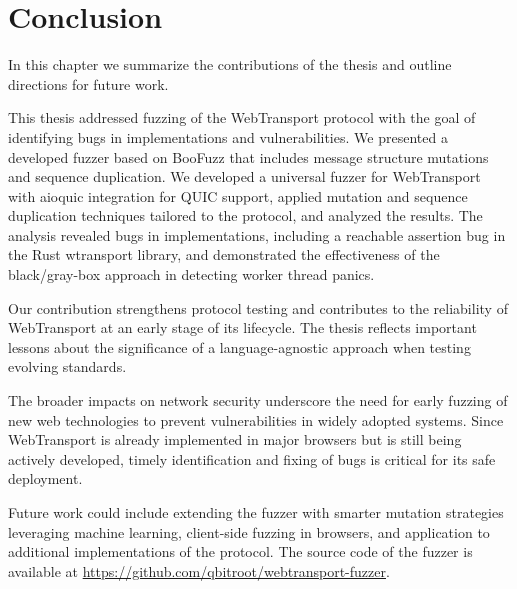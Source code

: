 \chapter*{Conclusion}

In this chapter we summarize the contributions of the thesis and outline directions for future work.

This thesis addressed fuzzing of the WebTransport protocol with the goal of identifying bugs in implementations and vulnerabilities. We presented a developed fuzzer based on BooFuzz that includes message structure mutations and sequence duplication. We developed a universal fuzzer for WebTransport with aioquic integration for QUIC support, applied mutation and sequence duplication techniques tailored to the protocol, and analyzed the results. The analysis revealed bugs in implementations, including a reachable assertion bug in the Rust wtransport library, and demonstrated the effectiveness of the black/gray-box approach in detecting worker thread panics.

Our contribution strengthens protocol testing and contributes to the reliability of WebTransport at an early stage of its lifecycle. The thesis reflects important lessons about the significance of a language-agnostic approach when testing evolving standards.

The broader impacts on network security underscore the need for early fuzzing of new web technologies to prevent vulnerabilities in widely adopted systems. Since WebTransport is already implemented in major browsers but is still being actively developed, timely identification and fixing of bugs is critical for its safe deployment.

Future work could include extending the fuzzer with smarter mutation strategies leveraging machine learning, client-side fuzzing in browsers, and application to additional implementations of the protocol. The source code of the fuzzer is available at \url{https://github.com/qbitroot/webtransport-fuzzer}.
